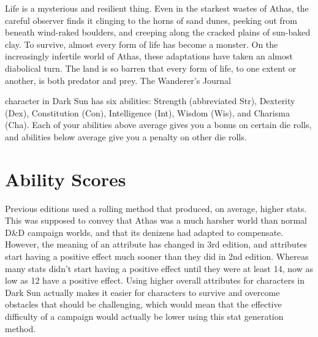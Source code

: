 {Life is a mysterious and resilient thing. Even in the starkest wastes of Athas, the careful observer finds it clinging to the horns of sand dunes, peeking out from beneath wind-raked boulders, and creeping along the cracked plains of sun-baked clay.
To survive, almost every form of life has become a monster. On the increasingly infertile world of Athas, these adaptations have taken an almost diabolical turn. The land is so barren that every form of life, to one extent or another, is both predator and prey.}
{The Wanderer's Journal}

 character in {\tableheader Dark Sun} has six abilities: Strength (abbreviated Str), Dexterity (Dex), Constitution (Con), Intelligence (Int), Wisdom (Wis), and Charisma (Cha). Each of your abilities above average gives you a bonus on certain die rolls, and abilities below average give you a penalty on other die rolls.

\section{Ability Scores}
Previous editions used a rolling method that produced, on average, higher stats. This was supposed to convey that Athas was a much harsher world than normal D\&D campaign worlds, and that its denizens had adapted to compensate. However, the meaning of an attribute has changed in 3rd edition, and attributes start having a positive effect much sooner than they did in 2nd edition. Whereas many stats didn't start having a positive effect until they were at least 14, now as low as 12 have a positive effect. Using higher overall attributes for characters in {\tableheader Dark Sun} actually makes it easier for characters to survive and overcome obstacles that should be challenging, which would mean that the effective difficulty of a campaign would actually be lower using this stat generation method.



